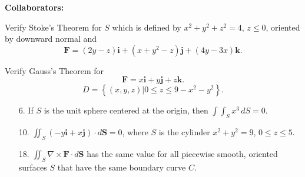 \documentclass[11pt,letterpaper,boxed]{hmcpset}
\newcommand{\pn}[1]{\left( #1 \right)}
\newcommand{\crb}[1]{\left\{ #1 \right\}}
\newcommand{\VEC}[1]{\ensuremath{\mathbf{#1}}\xspace}
\begin{document}
\noindent\textbf{Collaborators:} 


\begin{problem}[Colley 7.3 \#4]
Verify Stoke's Theorem for $S$ which is defined by $x^2+y^2+z^2=4$, $z\leq0$, oriented by downward normal and 
\[
	\VEC{F} = (2y-z)\VEC{i}+(x+y^2-z)\VEC{j}+(4y-3x)\VEC{k}.
\]
\end{problem}

\begin{solution}
\vfill
\end{solution}
\newpage

\begin{problem}[Colley 7.3 \#6]
Verify Gauss's Theorem for
\[
	\VEC{F} = x\VEC{i}+y\VEC{j}+z\VEC{k}.
\]
\[
	D = \crb{(x,y,z)|0\leq z\leq9-x^2-y^2}.
\]
\end{problem}

\begin{solution}
\vfill
\end{solution}
\newpage

\begin{problem}
\begin{enumerate}
\item[6.] If $S$ is the unit sphere centered at the origin, then $\int\int_Sx^3\,dS=0$.

\item[10.] $\iint_S\pn{-y\VEC{i}+x\VEC{j}}\cdot d\VEC{S}=0$, where $S$ is the cylinder $x^2+y^2=9$, $0\leq z\leq5.$

\item[18.] $\iint_S\nabla\times\VEC{F}\cdot d\VEC{S}$ has the same value for all piecewise smooth, oriented surfaces $S$ that have the same boundary curve $C$.
\end{enumerate}
\end{problem}

\begin{solution}
\vfill
\end{solution}
\newpage
\end{document}
